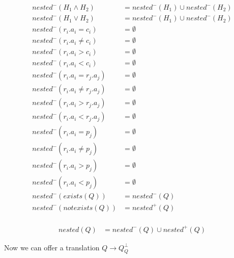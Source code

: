 \begin{mydef}
	\begin{align*}
		nested^-(H_1\land H_2) & =nested^-(H_1) \cup nested^-(H_2) \\
		nested^-(H_1\lor H_2) & =  nested^-(H_1) \cup nested^-(H_2) \\
		nested^-(r_i.a_i = c_i) & = \emptyset \\
		nested^-(r_i.a_i \neq c_i) & = \emptyset \\
		nested^-(r_i.a_i > c_i) & = \emptyset \\
		nested^-(r_i.a_i < c_i) & = \emptyset \\
		nested^-(r_i.a_i = r_j.a_j) & = \emptyset \\
		nested^-(r_i.a_i \neq r_j.a_j) & = \emptyset \\
		nested^-(r_i.a_i > r_j.a_j) & = \emptyset \\
		nested^-(r_i.a_i < r_j.a_j) & = \emptyset \\
		nested^-(r_i.a_i = p_j) & = \emptyset \\
		nested^-(r_i.a_i \neq p_j) & = \emptyset \\
		nested^-(r_i.a_i > p_j) & = \emptyset \\
		nested^-(r_i.a_i < p_j) & = \emptyset \\
		nested^-(exists(Q)) & =nested^-(Q) \\
		nested^-(notexists(Q)) & = nested^+(Q) \\
	\end{align*}

	
	\begin{align*}
		nested(Q) & = nested^-(Q) \cup nested^+(Q)
	\end{align*}
\end{mydef}
\fi

Now we can offer a translation $Q \rightarrow Q^\bot _Q$
\iffalse
\begin{figure}[H]
	\caption{\label{qq} Translatation $Q \rightarrow Q^\bot _Q$ }
	\begin{align*}
		notexists(Q')^\bot_Q & \rightarrow notexists(Q'^\bot_Q)
		\\exists(Q')^\bot_Q & \rightarrow exists(Q'^\bot_Q)
	\end{align*}
\end{figure}
\fi

